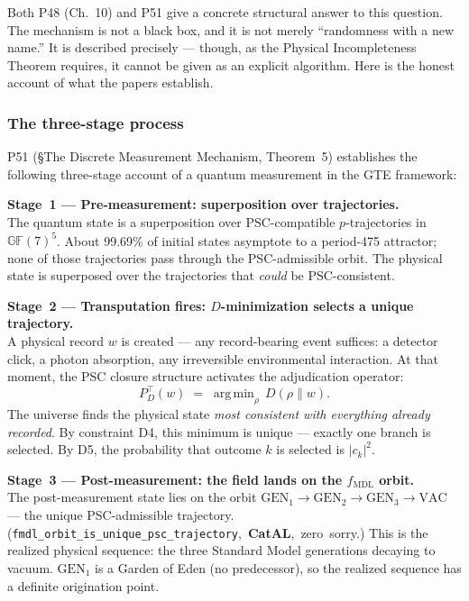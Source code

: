 \documentclass[11pt,a4paper]{article}
\newcommand{\lean}[1]{\texttt{#1}}
\newcommand{\CatAL}{\textbf{CatAL}}
\newcommand{\CatAD}{\textbf{CatAD}}
\begin{document}
\noindent
Both P48 (Ch.~10) and P51 give a concrete structural answer to this question.  The
mechanism is not a black box, and it is not merely ``randomness with a new name.''  It
is described precisely --- though, as the Physical Incompleteness Theorem requires, it
cannot be given as an explicit algorithm.  Here is the honest account of what the
papers establish.

\subsubsection*{The three-stage process}

P51 (§The Discrete Measurement Mechanism, Theorem~5) establishes the following
three-stage account of a quantum measurement in the GTE framework:

\medskip
\begin{tcolorbox}[colback=boxgreen,colframe=green!50!black,
  title={Discrete Measurement Mechanism (P51, \CatAD)},breakable]
\textbf{Stage~1 --- Pre-measurement: superposition over trajectories.}\\
The quantum state is a superposition over PSC-compatible $p$-trajectories in
$\mathbb{GF}(7)^5$.  About 99.69\% of initial states asymptote to a period-475
attractor; none of those trajectories pass through the PSC-admissible orbit.  The
physical state is superposed over the trajectories that \emph{could} be PSC-consistent.

\medskip\noindent
\textbf{Stage~2 --- Transputation fires: $D$-minimization selects a unique trajectory.}\\
A physical record $w$ is created --- any record-bearing event suffices: a detector
click, a photon absorption, any irreversible environmental interaction.  At that
moment, the PSC closure structure activates the adjudication operator:
\[
  P^\top_D(w) \;=\; \operatorname{arg\,min}_\rho\, D(\rho \| w).
\]
The universe finds the physical state \emph{most consistent with everything already
recorded}.  By constraint D4, this minimum is unique --- exactly one branch is
selected.  By D5, the probability that outcome $k$ is selected is $|c_k|^2$.

\medskip\noindent
\textbf{Stage~3 --- Post-measurement: the field lands on the $f_{\mathrm{MDL}}$ orbit.}\\
The post-measurement state lies on the orbit
$\mathrm{GEN}_1 \!\to\! \mathrm{GEN}_2 \!\to\! \mathrm{GEN}_3 \!\to\! \mathrm{VAC}$
--- the unique PSC-admissible trajectory.
\mbox{(\lean{fmdl\_orbit\_is\_unique\_psc\_trajectory}, \CatAL, zero sorry.)}
This is the realized physical sequence: the three Standard Model generations decaying
to vacuum.  $\mathrm{GEN}_1$ is a Garden of Eden (no predecessor), so the realized
sequence has a definite origination point.
\end{tcolorbox}
\end{document}

